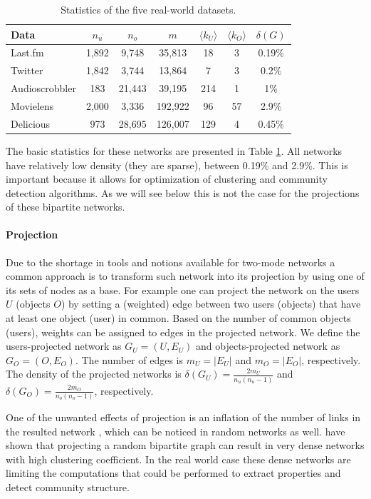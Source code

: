 \begin{table}[!h] \centering
\begin{tabular}{ l | c c c c c c }
 Data & $n_u$ & $n_o$ & $m$ & $\langle k_U \rangle$ & $\langle k_O \rangle$ &
 $\delta(G)$ \\
\hline
Last.fm & 1,892 & 9,748 & 35,813 & 18 & 3 & 0.19\% \\
Twitter & 1,842 & 3,744 & 13,864 & 7 & 3 & 0.2\% \\
Audioscrobbler & 183 & 21,443 & 39,195 & 214 & 1 & 1\% \\
Movielens & 2,000 & 3,336 & 192,922 & 96 & 57 & 2.9\% \\
Delicious & 973 & 28,695 & 126,007 & 129 & 4 & 0.45\% \\
\end{tabular}
\caption{Statistics of the five real-world datasets.}
\label{tab:datasets}
\end{table}

The basic statistics for these networks are presented in Table
\ref{tab:datasets}. All networks have relatively low density (they are sparse),
between 0.19\% and 2.9\%. This is important because it allows for optimization
of clustering and community detection algorithms. As we will see below this is
not the case for the projections of these bipartite networks.

\paragraph{Projection}

Due to the shortage in tools and notions available for two-mode networks a
common approach is to transform such network into its projection by using one
of its sets of nodes as a base. For example one can project the network on the
users $U$ (objects $O$) by setting a (weighted) edge between two users (objects)
that have at least one object (user) in common. Based on the number of common
objects (users), weights can be assigned to edges in the projected network. We
define the users-projected network as $G_U = (U, E_U)$ and objects-projected
network as $G_O = (O, E_O)$. The number of edges is $m_U = |E_U|$ and $m_O =
|E_O|$, respectively. The density of the projected networks is $\delta(G_U) =
\frac{2 m_U}{n_u (n_u-1)}$ and $\delta(G_O) = \frac{2 m_O}{n_o (n_o-1)}$,
respectively.

One of the unwanted effects of projection is an inflation of the number of links
in the resulted network \citep{latapy2008basic}, which can be noticed in random
networks as well. \citet{newman2001random} have shown that projecting a random
bipartite graph can result in very dense networks with high clustering
coefficient. In the real world case these dense networks are limiting the
computations that could be performed to extract properties and detect community
structure. 

